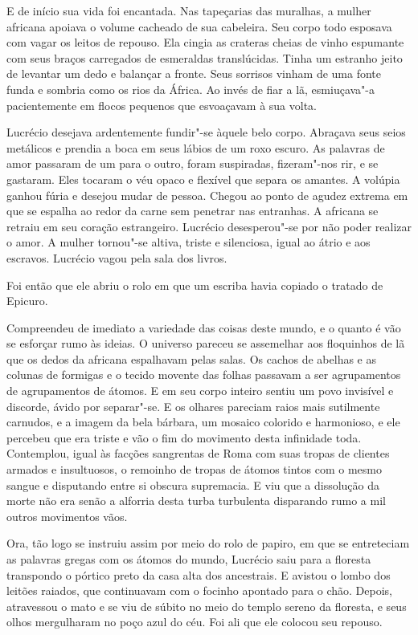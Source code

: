E de início sua vida foi encantada. Nas tapeçarias das muralhas, a mulher
africana apoiava o volume cacheado de sua cabeleira. Seu corpo todo
esposava com vagar os leitos de repouso. Ela cingia as crateras cheias de
vinho espumante com seus braços carregados de esmeraldas translúcidas.
Tinha um estranho jeito de levantar um dedo e balançar a fronte. Seus
sorrisos vinham de uma fonte funda e sombria como os rios da África. Ao
invés de fiar a lã, esmiuçava"-a pacientemente em flocos pequenos que
esvoaçavam à sua volta.

Lucrécio desejava ardentemente fundir"-se àquele belo corpo. Abraçava seus
seios metálicos e prendia a boca em seus lábios de um roxo escuro. As
palavras de amor passaram de um para o outro, foram suspiradas,
fizeram"-nos rir, e se gastaram. Eles tocaram o véu opaco e flexível que
separa os amantes. A volúpia ganhou fúria e desejou mudar de pessoa.
Chegou ao ponto de agudez extrema em que se espalha ao redor da carne sem
penetrar nas entranhas. A africana se retraiu em seu coração estrangeiro.
Lucrécio desesperou"-se por não poder realizar o amor. A mulher tornou"-se
altiva, triste e silenciosa, igual ao átrio e aos escravos. Lucrécio vagou
pela sala dos livros.

Foi então que ele abriu o rolo em que um escriba havia copiado o tratado de
Epicuro.

Compreendeu de imediato a variedade das coisas deste mundo, e o quanto é
vão se esforçar rumo às ideias. O universo pareceu se assemelhar aos
floquinhos de lã que os dedos da africana espalhavam pelas salas. Os
cachos de abelhas e as colunas de formigas e o tecido movente das folhas
passavam a ser agrupamentos de agrupamentos de átomos. E em seu corpo
inteiro sentiu um povo invisível e discorde, ávido por separar"-se. E os
olhares pareciam raios mais sutilmente carnudos, e a imagem da bela
bárbara, um mosaico colorido e harmonioso, e ele percebeu que era triste e
vão o fim do movimento desta infinidade toda. Contemplou, igual às facções
sangrentas de Roma com suas tropas de clientes armados e insultuosos, o
remoinho de tropas de átomos tintos com o mesmo sangue e disputando entre
si obscura supremacia. E viu que a dissolução da morte não era senão a
alforria desta turba turbulenta disparando rumo a mil outros movimentos
vãos.

Ora, tão logo se instruiu assim por meio do rolo de papiro, em que se
entreteciam as palavras gregas com os átomos do mundo, Lucrécio saiu para
a floresta transpondo o pórtico preto da casa alta dos ancestrais. E
avistou o lombo dos leitões raiados, que continuavam com o focinho
apontado para o chão. Depois, atravessou o mato e se viu de súbito no meio
do templo sereno da floresta, e seus olhos mergulharam no poço azul do
céu. Foi ali que ele colocou seu repouso.

